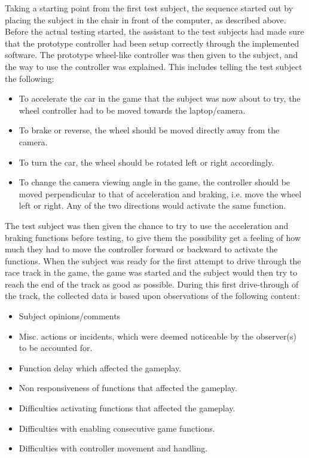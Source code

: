 Taking a starting point from the first test subject, the sequence started out by placing the subject in the chair in front of the computer, as described above. 
Before the actual testing started, the assistant to the test subjects had made sure that the prototype controller had been setup correctly through the implemented software. 
The prototype wheel-like controller was then given to the subject, and the way to use the controller was explained. This includes telling the test subject the following:

\begin{itemize}
\item To accelerate the car in the game that the subject was now about to try, the wheel controller had to be moved towards the laptop/camera.
\item To brake or reverse, the wheel should be moved directly away from the camera.
\item To turn the car, the wheel should be rotated left or right accordingly.
\item To change the camera viewing angle in the game, the controller should be moved perpendicular to that of acceleration and braking, i.e. move the wheel left or right. Any of the two directions would activate the same function.
\end{itemize}

The test subject was then given the chance to try to use the acceleration and braking functions before testing, to give them the possibility get a feeling of how much they had to move the controller forward or backward to activate the functions. 
When the subject was ready for the first attempt to drive through the race track in the game, the game was started and the subject would then try to reach the end of the track as good as possible. 
During this first drive-through of the track, the collected data is based upon observations of the following content:

\begin{itemize}
\item Subject opinions/comments
\item Misc. actions or incidents, which were deemed noticeable by the observer(s) to be accounted for.
\item Function delay which affected the gameplay.
\item Non responsiveness of functions that affected the gameplay.
\item Difficulties activating functions that affected the gameplay.
\item Difficulties with enabling consecutive game functions.
\item Difficulties with controller movement and handling.
\end{itemize}

